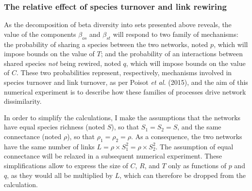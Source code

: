 \documentclass[10pt,oneside]{article}
\begin{document}
\hypertarget{the-relative-effect-of-species-turnover-and-link-rewiring}{%
\subsubsection{The relative effect of species turnover and link
rewiring}\label{the-relative-effect-of-species-turnover-and-link-rewiring}}

As the decomposition of beta diversity into sets presented above
reveals, the value of the components \(\beta_{os}\) and \(\beta_{st}\)
will respond to two family of mechanisms: the probability of sharing a
species between the two networks, noted \(p\), which will impose bounds
on the value of \(T\); and the probability of an interactions between
shared species \emph{not} being rewired, noted \(q\), which will impose
bounds on the value of \(C\). These two probabilities represent,
respectively, mechanisms involved in species turnover and link turnover,
as per Poisot \emph{et al.} (2015), and the aim of this numerical
experiment is to describe how these families of processes drive network
dissimilarity.

In order to simplify the calculations, I make the assumptions that the
networks have equal species richness (noted \(S\)), so that
\(S_1 = S_2 = S\), and the same connectance (noted \(\rho\)), so that
\(\rho_1 = \rho_2 = \rho\). As a consequence, the two networks have the
same number of links \(L = \rho\times S_1^2 = \rho\times S_2^2\). The
assumption of equal connectance will be relaxed in a subsequent
numerical experiment. These simplifications allow to express the size of
\(C\), \(R\), and \(T\) only as functions of \(p\) and \(q\), as they
would all be multiplied by \(L\), which can therefore be dropped from
the calculation.
\end{document}
